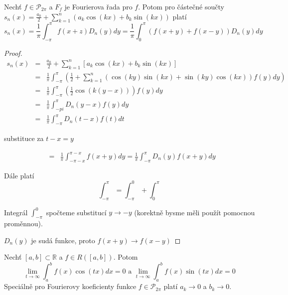 \begin{vetal}
Nechť $f \in \mathcal{P}_{2 \pi}$ a $F_f$ je Fourierova řada pro $f$. Potom pro částečné součty $s_n(x) = \frac{a_0}{2} + \sum_{k=1}^{n} (a_k \cos ( kx) + b_k \sin ( kx ))$ platí
$$s_n(x) = \frac{1}{\pi} \int_{-\pi}^\pi f(x+z)D_n(y)dy = \frac{1}{\pi} \int_0^\pi \left( f(x+y) + f(x-y) \right) D_n(y) dy$$
\end{vetal}

\begin{proof}
\begin{eqnarray*}
s_n(x) & = & \frac{a_0}{2} + \sum_{k=1}^{n} \left[ a_k \cos(kx) + b_k \sin(kx) \right] \\
& = & \frac{1}{\pi} \int_{-\pi}^\pi \left( \frac{1}{2} + \sum_{k=1}^n \left( \cos(ky) \sin(kx) + \sin(ky) \cos (kx) \right) f(y) dy \right) \\
& = & \frac{1}{\pi} \int_{-\pi}^\pi \left( \frac{1}{2} \cos(k(y-x))  \right) f(y) dy \\
& = & \frac{1}{\pi} \int_{-pi}^\pi D_n(y-x) f(y) dy \\
& = & \frac{1}{\pi} \int_{-\pi}^\pi D_n(t-x) f(t) dt 
\end{eqnarray*}

substituce za $t-x=y$

\begin{eqnarray*}
& = & \frac{1}{\pi} \int_{-\pi -x}^{\pi-x} f(x+y) dy = \frac{1}{\pi} \int_{-\pi}^\pi D_n(y) f(x+y) dy 
\end{eqnarray*}

Dále platí 
$$\int_{-\pi}^\pi = \int_{-\pi}^0 + \int_{0}^\pi$$

Integrál $\int_{-\pi}^0$ spočteme substitucí $y \rightarrow -y$ (korektně bysme měli použít pomocnou proměnnou).

$D_n(y)$ je sudá funkce, proto $f(x+y) \rightarrow f(x-y)$
\end{proof}

\begin{vetat}
\label{Riemann-Lebesqueovo lemma}
Nechť $[a,b] \subset \mathbb{R}$ a $f \in R([a,b])$. Potom
$$\lim_{t \rightarrow \infty} \int_a^b f(x) \cos(tx) dx = 0 \textrm{ a } \lim_{t \rightarrow \infty} \int_a^b f(x) \sin(tx) dx = 0$$
Speciálně pro Fourierovy koeficienty funkce $f \in \mathcal{P}_{2 \pi}$ platí $a_k \rightarrow 0$ a $b_k \rightarrow 0$.
\end{vetat}

